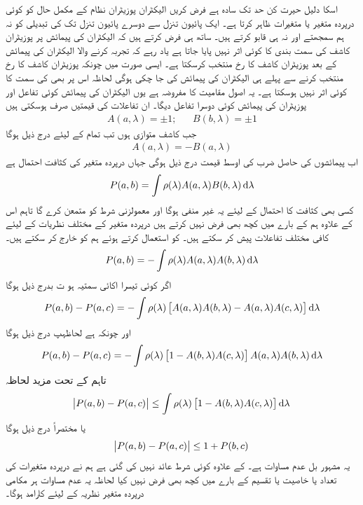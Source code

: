 اسکا دلیل حیرت کن حد تک سادہ ہے فرض کریں الیکٹران پوزیٹران نظام کے مکمل حال کو کوئی درپردہ متغیر یا متغیرات  ظاہر کرتا ہے۔ ایک پائیون تنزل سے دوسرے پائیون تنزل تک  کی تبدیلی کو نہ ہم سمجھتے اور نہ ہی قابو کرتے ہیں۔ ساتھ ہی فرض کرتے ہیں کہ الیکٹران کی پیمائش پر پوزیٹران کاشف کی سمت بندی  کا کوئی اثر نہیں پایا جاتا ہے یاد رہے کہ تجربہ کرنے والا الیکٹران کی پیمائش کے بعد پوزیٹران کاشف کا رخ منتخب کرسکتا ہے۔ ایسی صورت میں چونکہ پوزیٹران کاشف کا رخ منتخب کرنے سے پہلے ہی الیکٹران کی پیمائش کی جا چکی ہوگی لحاظہ اس پر بھی کی سمت کا کوئی اثر نہیں ہوسکتا ہے۔ یہ اصول مقامیت کا مفروضہ ہے یوں الیکٹران کی پیمائش کوئی تفاعل  اور پوزیٹران کی پیمائش کوئی دوسرا تفاعل  دیگا۔ ان تفاعلات کی قیمتیں صرف  ہوسکتی ہیں
\begin{align}
	A(a, \lambda) = \pm1; && B(b, \lambda) = \pm1
\end{align}
جب کاشف متوازی ہوں تب تمام  کے لیئے درج ذیل ہوگا 
\begin{align}
	A(a, \lambda) = -B(a, \lambda)
\end{align}
اب پیمائشوں کی حاصل ضرب کی اوسط قیمت درج ذیل ہوگی جہاں  درپردہ متغیر کی کثافت احتمال ہے
\begin{align}
	P(a, b) = \int\rho(\lambda)A(a, \lambda)B(b, \lambda)\dif\lambda
\end{align}
کسی بھی کثافت کا احتمال کے لیئے یہ غیر منفی ہوگا اور معمولزنی شرط  کو متمعن کرے گا تاہم اس کے علاوہ ہم  کے بارے میں کچھ بھی فرض نہیں کرتے ہیں درپردہ متغیر کے مختلف نظریات  کے لیئے کافی مختلف تفاعلات پیش کر سکتے ہیں۔  کو استعمال کرتے ہوئے ہم  کو خارج کر سکتے ہیں۔
\begin{align}
	P(a, b) = -\int\rho(\lambda)A(a, \lambda)A(b, \lambda)\dif\lambda
\end{align}
اگر  کوئی تیسرا اکائی سمتیہ ہو ت بدرج ذیل ہوگا
\begin{align}
	P(a, b)-P(a, c) = -\int\rho(\lambda)\left[A(a, \lambda)A(b, \lambda)-A(a, \lambda)A(c, \lambda)\right]\dif\lambda
\end{align}
اور چونکہ  ہے لحاظہپ درج ذیل ہوگا 
\begin{align}
	P(a, b)-P(a, c) =-\int\rho(\lambda)\left[1-A(b, \lambda)A(c, \lambda)\right]A(a, \lambda)A(b, \lambda)\dif\lambda
\end{align}
تاہم  کے تحت  مزید  لحاظہ 
\begin{align}
	\abs{P(a, b)-P(a,c)}\leq\int\rho(\lambda)\left[1-A(b, \lambda)A(c, \lambda)\right]\dif\lambda
\end{align}
یا مختصراً درج ذیل ہوگا
\begin{align}
	\abs{P(a, b)-P(a, c)}\leq1+P(b, c)
\end{align}
یہ مشہور بل عدم مساوات ہے۔  کے علاوہ کوئی شرط عائد نہیں کی گئی ہے ہم نے درپردہ متغیرات کی تعداد یا خاصیت یا تقسیم  کے بارے میں کچھ بھی فرض نہیں کیا لحاظہ یہ عدم مساوات ہر مکامی درپردہ متغیر نظریہ کے لیئے کارامد ہوگا۔



